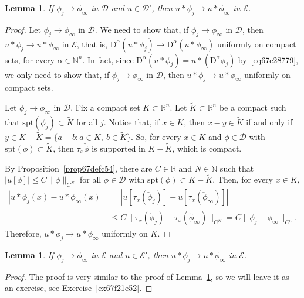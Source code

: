 \documentclass[a4paper,9pt]{amsart}
\newcommand{\scr}[1]{\mathscr{#1}}
\newcommand{\N}{\mathbb{N}}	%
\newcommand{\R}{\mathbb{R}}	%
\newcommand{\Diff}{\mathrm{D}}
\newcommand{\spt}{\mathrm{spt}}
\theoremstyle{plain}
\newtheorem{lemma}[proposition]{Lemma}
\theoremstyle{definition}
\theoremstyle{remark}
\begin{document}
\begin{lemma}\label{lem67ebad94}
	If $\phi_j\to\phi_\infty$ in $\scr D$ and $u\in\scr D'$, 
	then $u*\phi_j\to u*\phi_\infty$ in $\scr E$.
%	
\end{lemma}
\begin{proof}
%	
	Let $\phi_j\to\phi_\infty$ in $\scr D$.
	We need to show that, if $\phi_j\to\phi_\infty$ in $\scr D$, then $u*\phi_j\to u*\phi_\infty$ in $\scr E$,
	that is, $\Diff^\alpha(u*\phi_j)\to \Diff^\alpha(u*\phi_\infty)$ uniformly on compact sets, for every $\alpha\in\N^n$.
	In fact, since $\Diff^\alpha(u*\phi_j) = u*(\Diff^\alpha\phi_j)$ by~\eqref{eq67e28779}, 
	we only need to show that, if $\phi_j\to\phi_\infty$ in $\scr D$, then $u*\phi_j\to u*\phi_\infty$ uniformly on compact sets.
	
	Let $\phi_j\to\phi_\infty$ in $\scr D$.
	Fix a compact set $K\subset\R^n$.
	Let $\tilde K\subset\R^n$ be a compact such that $\spt(\phi_j)\subset \tilde K$ for all $j$.
	Notice that, if $x\in K$, then $x-y\in\tilde K$ if and only if $y\in K-\tilde K = \{a-b: a\in K,\ b\in\tilde K\}$.
	So, for every $x\in K$ and $\phi\in\scr D$ with $\spt(\phi)\subset\tilde K$, 
	then $\tau_x\check\phi$ is supported in $K-\tilde K$, which is compact.
	
	By Proposition~\ref{prop67defc54}, there are $C\in\R$ and $N\in\N$ such that $|u[\phi]| \le C\|\phi\|_{C^N}$ for all $\phi\in\scr D$ with $\spt(\phi)\subset K-\tilde K$.
%	
	Then, for every $x\in K$,
	\begin{align*}
	|u*\phi_j(x) - u*\phi_\infty(x)|
	&= |u[\tau_x(\check \phi_j)] - u[\tau_x(\check \phi_\infty)]| \\
	&\le C \|\tau_x(\check \phi_j) - \tau_x(\check \phi_\infty)\|_{C^N} 
	= C\| \phi_j - \phi_\infty\|_{C^n} .
	\end{align*}
	Therefore, $u*\phi_j\to u*\phi_\infty$ uniformly on $K$.
\end{proof}
\begin{lemma}\label{lem67f21e2a}
	If $\phi_j\to\phi_\infty$ in $\scr E$ and $u\in\scr E'$, 
	then $u*\phi_j\to u*\phi_\infty$ in $\scr E$.
\end{lemma}
\begin{proof}
	The proof is very similar to the proof of Lemma~\ref{lem67ebad94},
	so we will leave it as an exercise, see Exercise~\ref{ex67f21e52}.
\end{proof}
\end{document}
